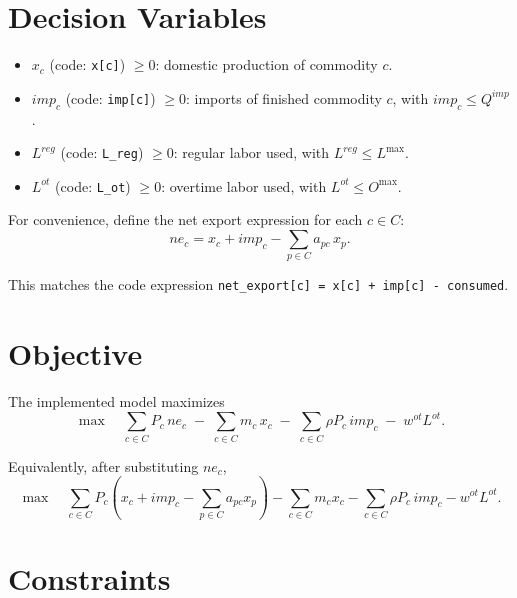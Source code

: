 \section*{Decision Variables}

\begin{itemize}
    \item \(x_c\) (code: \texttt{x[c]}) \(\ge 0\): domestic production of commodity \(c\).
    \item \(imp_c\) (code: \texttt{imp[c]}) \(\ge 0\): imports of finished commodity \(c\), with \(imp_c \le Q^{imp}\).
    \item \(L^{reg}\) (code: \texttt{L\_reg}) \(\ge 0\): regular labor used, with \(L^{reg} \le L^{\max}\).
    \item \(L^{ot}\) (code: \texttt{L\_ot}) \(\ge 0\): overtime labor used, with \(L^{ot} \le O^{\max}\).
\end{itemize}

For convenience, define the net export expression for each \(c \in C\):
\[
ne_c = x_c + imp_c - \sum_{p \in C} a_{pc}\,x_p .
\]

This matches the code expression \texttt{net\_export[c] = x[c] + imp[c] - consumed}.

\section*{Objective}

The implemented model maximizes
\[
\max \quad
\sum_{c \in C} P_c\, ne_c
\;-\;
\sum_{c \in C} m_c\, x_c
\;-\;
\sum_{c \in C} \rho P_c\, imp_c
\;-\;
w^{ot} L^{ot}.
\]

Equivalently, after substituting \(ne_c\),
\[
\max \quad
\sum_{c \in C} P_c\!\left(x_c + imp_c - \sum_{p \in C} a_{pc}x_p\right)
-
\sum_{c \in C} m_c x_c
-
\sum_{c \in C} \rho P_c\, imp_c
-
w^{ot}L^{ot}.
\]

\section*{Constraints}


